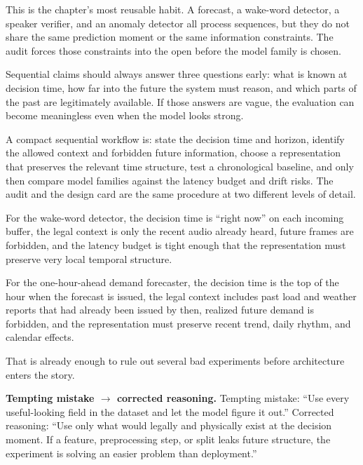 This is the chapter's most reusable habit. A forecast, a wake-word detector, a speaker verifier, and an anomaly detector all process sequences, but they do not share the same prediction moment or the same information constraints. The audit forces those constraints into the open before the model family is chosen.

\begin{decisionbox}
Sequential claims should always answer three questions early: what is known at decision time, how far into the future the system must reason, and which parts of the past are legitimately available. If those answers are vague, the evaluation can become meaningless even when the model looks strong.
\end{decisionbox}

\begin{practicalnote}
A compact sequential workflow is: state the decision time and horizon, identify the allowed context and forbidden future information, choose a representation that preserves the relevant time structure, test a chronological baseline, and only then compare model families against the latency budget and drift risks. The audit and the design card are the same procedure at two different levels of detail.
\end{practicalnote}

\begin{example}
For the wake-word detector, the decision time is ``right now'' on each incoming buffer, the legal context is only the recent audio already heard, future frames are forbidden, and the latency budget is tight enough that the representation must preserve very local temporal structure.

For the one-hour-ahead demand forecaster, the decision time is the top of the hour when the forecast is issued, the legal context includes past load and weather reports that had already been issued by then, realized future demand is forbidden, and the representation must preserve recent trend, daily rhythm, and calendar effects.

That is already enough to rule out several bad experiments before architecture enters the story.
\end{example}

\begin{thinkingtool}
\textbf{Tempting mistake $\rightarrow$ corrected reasoning.} Tempting mistake: ``Use every useful-looking field in the dataset and let the model figure it out.'' Corrected reasoning: ``Use only what would legally and physically exist at the decision moment. If a feature, preprocessing step, or split leaks future structure, the experiment is solving an easier problem than deployment.''
\end{thinkingtool}


